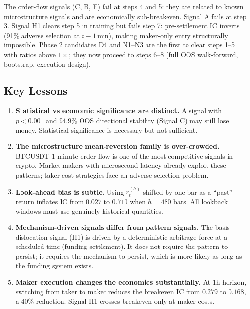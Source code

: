 \documentclass[12pt, a4paper]{article}
\theoremstyle{definition}
\begin{document}
The order-flow signals (C, B, F) fail at steps 4 and 5: they are related to
known microstructure signals and are economically sub-breakeven. Signal A
fails at step 3. Signal H1 clears step 5 in training but fails step 7:
pre-settlement IC inverts (91\% adverse selection at $t-1$\,min), making
maker-only entry structurally impossible. Phase 2 candidates D4 and N1--N3
are the first to clear steps 1--5 with ratios above $1\times$; they now
proceed to steps 6--8 (full OOS walk-forward, bootstrap, execution design).

\subsection{Key Lessons}

\begin{enumerate}
  \item \textbf{Statistical vs economic significance are distinct.}
        A signal with $p < 0.001$ and $94.9\%$ OOS directional stability
        (Signal C) may still lose money. Statistical significance is necessary
        but not sufficient.

  \item \textbf{The microstructure mean-reversion family is over-crowded.}
        BTCUSDT 1-minute order flow is one of the most competitive signals
        in crypto. Market makers with microsecond latency already exploit
        these patterns; taker-cost strategies face an adverse selection
        problem.

  \item \textbf{Look-ahead bias is subtle.}
        Using $r_t^{(h)}$ shifted by one bar as a ``past'' return inflates
        IC from $0.027$ to $0.710$ when $h = 480$ bars. All lookback windows
        must use genuinely historical quantities.

  \item \textbf{Mechanism-driven signals differ from pattern signals.}
        The basis dislocation signal (H1) is driven by a deterministic
        arbitrage force at a scheduled time (funding settlement). It does not
        require the pattern to persist; it requires the mechanism to persist,
        which is more likely as long as the funding system exists.

  \item \textbf{Maker execution changes the economics substantially.}
        At 1h horizon, switching from taker to maker reduces the breakeven IC
        from $0.279$ to $0.168$, a $40\%$ reduction. Signal H1 crosses
        breakeven only at maker costs.


\end{enumerate}
\end{document}
